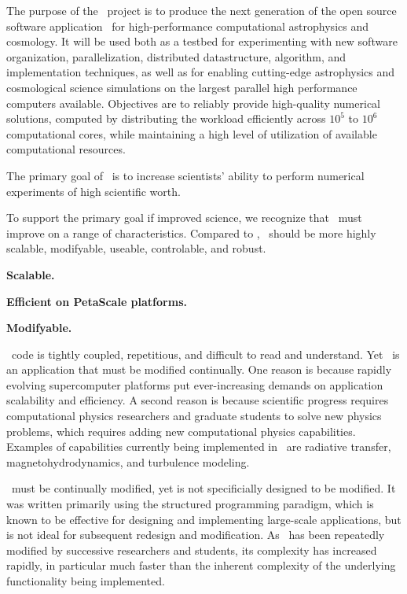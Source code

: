\documentclass[11pt]{article}
\begin{document}
    The purpose of the \cello\ project is to produce the next
    generation of the open source software application \enzo\ for
    high-performance computational astrophysics and cosmology.  It
    will be used both as a testbed for experimenting with new software
    organization, parallelization, distributed datastructure,
    algorithm, and implementation techniques, as well as for enabling
    cutting-edge astrophysics and cosmological science simulations on
    the largest parallel high performance computers available.
    Objectives are to reliably provide high-quality numerical
    solutions, computed by distributing the workload efficiently
    across $10^5$ to $10^6$ computational cores, while maintaining a
    high level of utilization of available computational resources.


    The primary goal of \cello\ is to increase scientists' ability to
    perform numerical experiments of high scientific worth.  



    To support the primary goal if improved science, we recognize that
    \cello\ must improve on a range of characteristics.  Compared to
    \enzo, \cello\ should be more highly scalable, modifyable,
    useable, controlable, and robust.


    \textbf{Scalable.}

    \textbf{Efficient on PetaScale platforms.}


    \textbf{Modifyable.}

    \enzo\ code is tightly coupled, repetitious, and difficult to read
    and understand.  Yet \enzo\ is an application that must be
    modified continually.  One reason is because rapidly evolving
    supercomputer platforms put ever-increasing demands on application
    scalability and efficiency.  A second reason is because scientific
    progress requires computational physics researchers and graduate
    students to solve new physics problems, which requires adding new
    computational physics capabilities.  Examples of capabilities
    currently being implemented in \enzo\ are radiative transfer,
    magnetohydrodynamics, and turbulence modeling.

    \enzo\ must be continually modified, yet is not specificially
    designed to be modified.  It was written primarily using the
    structured programming paradigm, which is known to be effective
    for designing and implementing large-scale applications, but is
    not ideal for subsequent redesign and modification.  As \enzo\ has
    been repeatedly modified by successive researchers and students,
    its complexity has increased rapidly, in particular much faster
    than the inherent complexity of the underlying functionality being
    implemented.
\end{document}
